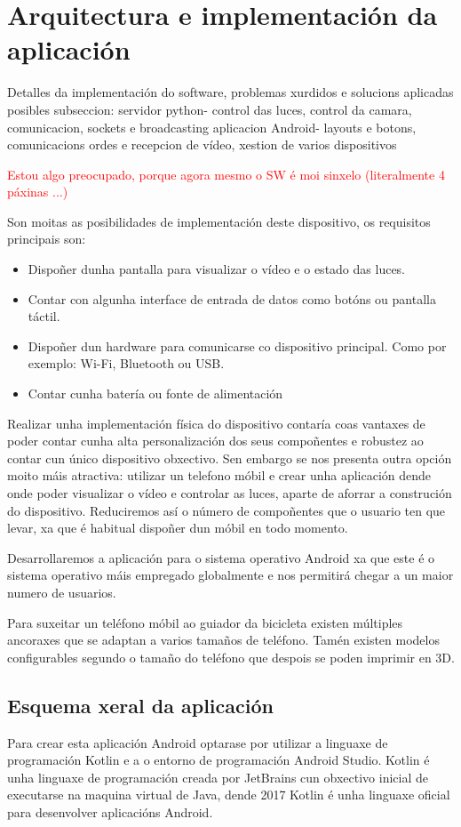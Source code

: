 \chapter{Arquitectura e implementación da aplicación}
\label{chap:implementacion_aplicacion}
Detalles da implementación do software, problemas xurdidos e solucions aplicadas
posibles subseccion:
servidor python- control das luces, control da camara, comunicacion, sockets e broadcasting
aplicacion Android- layouts e botons, comunicacions ordes e recepcion de vídeo, xestion de varios dispositivos


\textcolor{red}{Estou algo preocupado, porque agora mesmo o SW é moi sinxelo (literalmente 4 páxinas ...)}


Son moitas as posibilidades de implementación deste dispositivo, os requisitos principais son:
\begin{itemize}
    \item Dispoñer dunha pantalla para visualizar o vídeo e o estado das luces.
    \item Contar con algunha interface de entrada de datos como botóns ou pantalla táctil.
    \item Dispoñer dun hardware para comunicarse co dispositivo principal. Como por exemplo: Wi-Fi, Bluetooth ou USB.
    \item Contar cunha batería ou fonte de alimentación
\end{itemize}

Realizar unha implementación física do dispositivo contaría coas vantaxes de poder contar cunha alta personalización dos seus compoñentes e robustez ao contar cun único dispositivo obxectivo. Sen embargo se nos presenta outra opción moito máis atractiva: utilizar un telefono móbil e crear unha aplicación dende onde poder visualizar o vídeo e controlar as luces, aparte de aforrar a construción do dispositivo. Reduciremos así o número de compoñentes que o usuario ten que levar, xa que é habitual dispoñer dun móbil en todo momento.

Desarrollaremos a aplicación para o sistema operativo Android xa que este é o sistema operativo máis empregado globalmente e nos permitirá chegar a un maior numero de usuarios.

Para suxeitar un teléfono móbil ao guiador da bicicleta existen múltiples ancoraxes que se adaptan a varios tamaños de teléfono. Tamén existen modelos configurables segundo o tamaño do teléfono que despois se poden imprimir en 3D.

\section{Esquema xeral da aplicación}
Para crear esta aplicación Android optarase por utilizar a linguaxe de programación Kotlin e a o entorno de programación Android Studio. Kotlin é unha linguaxe de programación creada por JetBrains cun obxectivo inicial de executarse na maquina virtual de Java, dende 2017 Kotlin é unha linguaxe oficial para desenvolver aplicacións Android.

